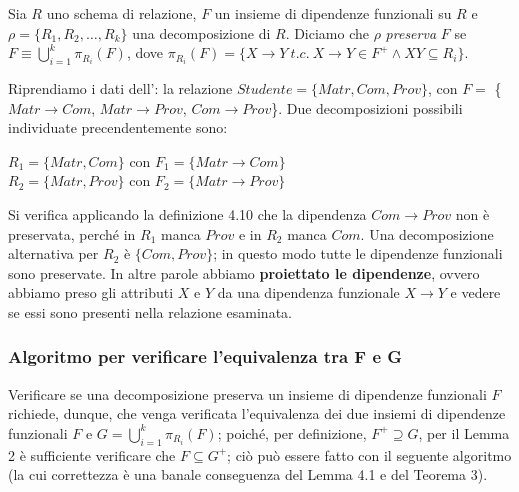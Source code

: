 \begin{defn}
Sia $R$ uno schema di relazione, $F$ un insieme di dipendenze funzionali su $R$ e $\rho = \{R_1, R_2, \ldots,
R_k\}$ una decomposizione di $R$. Diciamo che $\rho$ \emph{preserva} $F$ se $F \equiv \bigcup_{i=1}^k 
\pi_{R_i}(F)$, dove $\pi_{R_i}(F) = \{X \rightarrow Y\ t.c.\ X \rightarrow Y \in F^+ \wedge XY \subseteq R_i\}$.
\end{defn}

\begin{exmp}
 Riprendiamo i dati dell': la relazione $Studente = \{Matr, Com, Prov\}$,
 con $F = $ \{$Matr\rightarrow Com$, $Matr\rightarrow Prov$, $Com\rightarrow Prov$\}. Due decomposizioni possibili
 individuate precendentemente sono:
  \begin{center}
    $R_1 = \{Matr, Com\}$ con $F_1 = \{Matr\rightarrow Com\}$ \\
    $R_2 = \{Matr, Prov\}$ con $F_2 = \{Matr\rightarrow Prov\}$ \\
   \end{center}
 Si verifica applicando la definizione 4.10 che la dipendenza $Com \rightarrow Prov$ non è preservata, 
 perché in $R_1$ manca $Prov$ e in $R_2$ manca $Com$. Una decomposizione alternativa per $R_2$ è
 $\{Com, Prov\}$; in questo modo tutte le dipendenze funzionali sono preservate. In altre parole abbiamo
 \textbf{proiettato le dipendenze}, ovvero abbiamo preso gli attributi $X$ e $Y$ da una dipendenza funzionale
 $X \rightarrow Y$ e vedere se essi sono presenti nella relazione esaminata.
\end{exmp}


\subsubsection{Algoritmo per verificare l'equivalenza tra F e G}
Verificare se una decomposizione preserva un insieme di dipendenze funzionali $F$ richiede, dunque,
che venga verificata l'equivalenza dei due insiemi di dipendenze funzionali $F$ e $G = \bigcup_{i=1}^k
\pi_{R_i}(F)$; poiché, per definizione, $F^+ \supseteq G$, per il Lemma 2 è sufficiente verificare che $F\subseteq 
G^+$; ciò può essere fatto con il seguente algoritmo (la cui correttezza è una banale conseguenza del Lemma 4.1 e
del Teorema 3).

